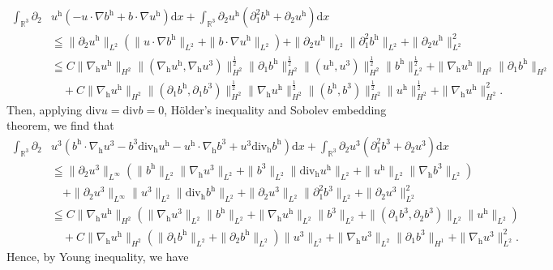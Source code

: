 \documentclass[11pt]{amsart}
\theoremstyle{definition}
\newcommand{\R}{\mathbb{R}}
\newcommand{\h}{\mathrm{h}}
\newcommand{\nablah}{\nabla_{\mathrm{h}}}
\numberwithin{equation}{section}
\begin{document}
\begin{align}\label{f_1}
	\int_{\R^3}\partial_2 &u^\h\left(-u\cdot\nabla b^\h +b\cdot\nabla u^\h\right)\mathrm{d} x+\int_{\R^3}\partial_2 u^\h\left(\partial_1^2 b^\h +\partial_2 u^\h\right)\mathrm{d}x\nonumber\\
	&\leqq \|\partial_2u^\h\|_{L^2}\left(\|u\cdot\nabla b^\h\|_{L^2}+\|b\cdot\nabla u^\h\|_{L^2}\right)+\|\partial_2u^\h\|_{L^2}\|\partial_1^2 b^\h\|_{L^2}+\|\partial_2u^\h\|_{L^2}^2\nonumber\\
	&\leqq C\|\nablah u^\h\|_{H^2}\|(\nablah u^\h,\nablah u^3)\|_{H^2}^\frac12\|\partial_1 b^\h\|_{H^2}^\frac12\|( u^\h, u^3)\|_{H^2}^\frac12\|b^\h\|_{L^2}^\frac12+\|\nablah u^\h\|_{H^2}\|\partial_1 b^\h\|_{H^2}\nonumber\\
	&\quad+C\|\nablah u^\h\|_{H^2}\|(\partial_1b^\h,\partial_1b^3)\|_{H^2}^\frac12\|\nablah u^\h\|_{H^2}^\frac12\|(b^\h,b^3)\|_{H^2}^\frac12\| u^\h\|_{H^2}^\frac12+\|\nablah u^\h\|_{H^2}^2.
\end{align}
Then, applying $\mathrm{div} u=\mathrm{div} b=0$, H\"older's inequality and Sobolev embedding theorem, we find that
\begin{align*}
	\int_{\R^3}\partial_2 &u^3\left(b^\h \cdot\nabla_\h u^3- b^3\mathrm{div_h}u^\h -u^\h\cdot\nabla_\h b^3+u^3\mathrm{div_h} b^\h \right)\mathrm{d} x+\int_{\R^3}\partial_2 u^3\left(\partial_1^2 b^3 +\partial_2 u^3\right)\mathrm{d}x
	\\&\leqq\|\partial_2 u^3\|_{L^\infty}\left( \|b^\h\|_{L^2}\|\nabla_\h u^3\|_{L^2}+\|b^3\|_{L^2}\|\mathrm{div_h}u^\h\|_{L^2}+\|u^\h\|_{L^2}\|\nabla_\h b^3\|_{L^2}\right)\\
	&\quad+\|\partial_2 u^3\|_{L^\infty}\|u^3\|_{L^2}\|\mathrm{div_h} b^\h\|_{L^2}+\|\partial_2u^3\|_{L^2}\|\partial_1^2 b^3\|_{L^2}+\|\partial_2u^3\|_{L^2}^2\\
	&\leqq C\|\nablah u^\h\|_{H^2}\left( \|\nabla_\h u^3\|_{L^2}\|b^\h\|_{L^2}+\|\nabla_\h u^\h\|_{L^2}\|b^3\|_{L^2}+\|(\partial_1 b^3,\partial_2 b^3)\|_{L^2}\|u^\h\|_{L^2}\right)\\
	&\quad+C\|\nablah u^\h\|_{H^2}\left(\|\partial_1 b^\h\|_{L^2}+\|\partial_2 b^\h\|_{L^2}\right)\|u^3\|_{L^2}+\|\nablah u^3\|_{L^2}\|\partial_1 b^3\|_{H^1}+\|\nablah u^3\|_{L^2}^2.
\end{align*}
Hence, by Young inequality, we have
\end{document}
